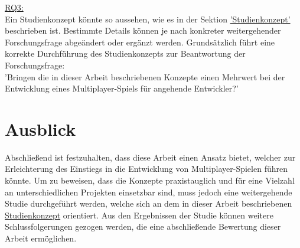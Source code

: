 \hyperref[RQ3]{RQ3:} \\
Ein Studienkonzept könnte so aussehen, wie es in der Sektion \hyperref[studienkonzept]{'Studienkonzept'} beschrieben ist. Bestimmte Details können je nach konkreter weitergehender Forschungsfrage abgeändert oder ergänzt werden. Grundsätzlich führt eine korrekte Durchführung des Studienkonzepts zur Beantwortung der Forschungsfrage: \\
'Bringen die in dieser Arbeit beschriebenen Konzepte einen Mehrwert bei der Entwicklung eines Multiplayer-Spiels für angehende Entwickler?'

\section{Ausblick}

Abschließend ist festzuhalten, dass diese Arbeit einen Ansatz bietet, welcher zur Erleichterung des Einstiegs in die Entwicklung von Multiplayer-Spielen führen könnte. Um zu beweisen, dass die Konzepte praxistauglich und für eine Vielzahl an unterschiedlichen Projekten einsetzbar sind, muss jedoch eine weitergehende Studie durchgeführt werden, welche sich an dem in dieser Arbeit beschriebenen \hyperref[studienkonzept]{Studienkonzept} orientiert. Aus den Ergebnissen der Studie können weitere Schlussfolgerungen gezogen werden, die eine abschließende Bewertung dieser Arbeit ermöglichen.